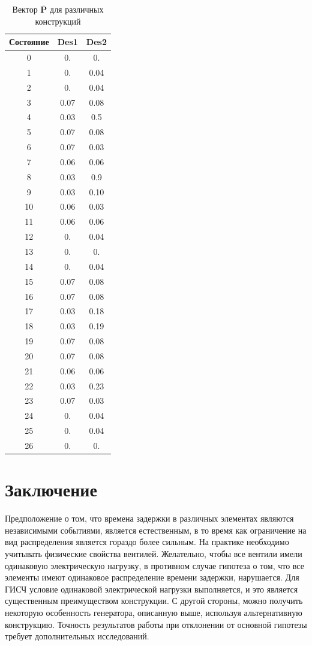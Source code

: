 \documentclass[a4paper,12pt]{article}
\begin{document}
\begin{table}[h]
\centering
\caption{Вектор $\overline{\mathbf{P}}$ для различных конструкций}
\label{tab:8}
\begin{tabular}{c|cc}
Состояние & Des1 & Des2 \\ \hline
0 & 0. & 0. \\
1 & 0. & 0.04 \\
2 & 0. & 0.04 \\
3 & 0.07 & 0.08 \\
4 & 0.03 & 0.5 \\
5 & 0.07 & 0.08 \\
6 & 0.07 & 0.03 \\
7 & 0.06 & 0.06 \\
8 & 0.03 & 0.9 \\
9 & 0.03 & 0.10 \\
10 & 0.06 & 0.03 \\
11 & 0.06 & 0.06 \\
12 & 0. & 0.04 \\
13 & 0. & 0. \\
14 & 0. & 0.04 \\
15 & 0.07 & 0.08 \\
16 & 0.07 & 0.08 \\
17 & 0.03 & 0.18 \\
18 & 0.03 & 0.19 \\
19 & 0.07 & 0.08 \\
20 & 0.07 & 0.08 \\
21 & 0.06 & 0.06 \\
22 & 0.03 & 0.23 \\
23 & 0.07 & 0.03 \\
24 & 0. & 0.04 \\
25 & 0. & 0.04 \\
26 & 0. & 0.
\end{tabular}
\end{table}

\section{Заключение}

Предположение о том, что времена задержки в различных элементах являются независимыми событиями, является естественным, в то время как ограничение на вид распределения является гораздо более сильным. На практике необходимо учитывать физические свойства вентилей. Желательно, чтобы все вентили имели одинаковую электрическую нагрузку, в противном случае гипотеза о том, что все элементы имеют одинаковое распределение времени задержки, нарушается. Для ГИСЧ условие одинаковой электрической нагрузки выполняется, и это является существенным преимуществом конструкции. С другой стороны, можно получить некоторую особенность генератора, описанную выше, используя альтернативную конструкцию. Точность результатов работы при отклонении от основной гипотезы требует дополнительных исследований.
\end{document}

